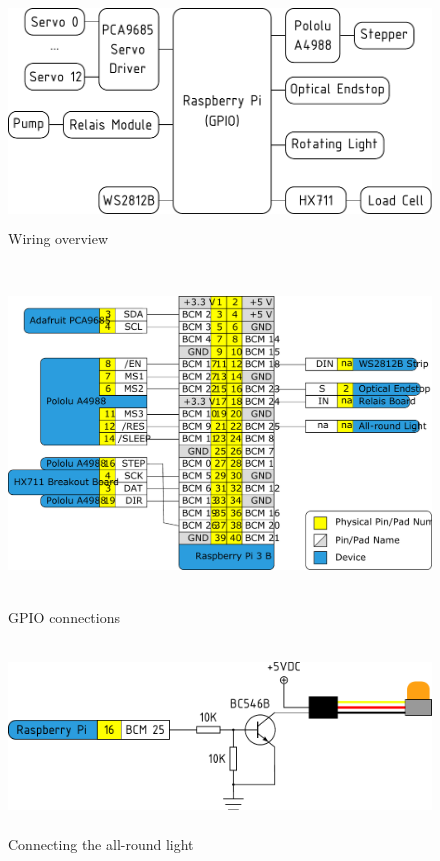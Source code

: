\documentclass[a4paper]{scrartcl}
\begin{document}
\begin{figure}
  \centering
  \includegraphics[height=6cm]{pics/RPi_GPIO_overview.pdf}
  \caption{Wiring overview} \label{GPIO_overview}
\end{figure}

\begin{figure}
  \centering
  \includegraphics[height=9cm]{pics/Hector9000_connections.pdf}
  \caption{GPIO connections} \label{GPIO_connections}
\end{figure}

\begin{figure}
  \centering
  \includegraphics[height=5cm]{pics/rundumlicht.pdf}
  \caption{Connecting the all-round light} \label{rundumlicht}
\end{figure}
\end{document}
